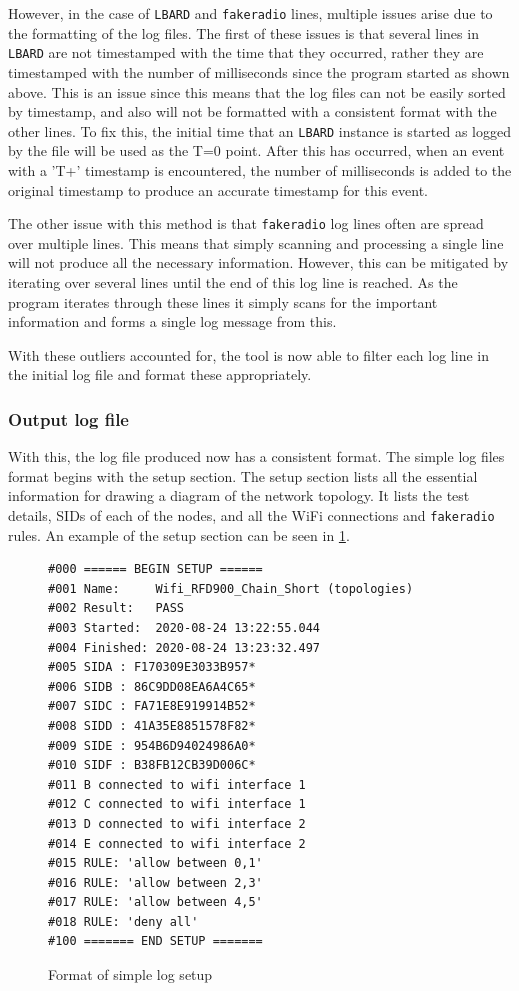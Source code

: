 However, in the case of \texttt{LBARD} and \texttt{fakeradio} lines, multiple issues arise due to the formatting of the log files.
The first of these issues is that several lines in \texttt{LBARD} are not timestamped with the time that they occurred, rather they are timestamped with the number of milliseconds since the program started as shown above.
This is an issue since this means that the log files can not be easily sorted by timestamp, and also will not be formatted with a consistent format with the other lines.
To fix this, the initial time that an \texttt{LBARD} instance is started as logged by the file will be used as the T=0 point.
After this has occurred, when an event with a 'T+' timestamp is encountered, the number of milliseconds is added to the original timestamp to produce an accurate timestamp for this event.

The other issue with this method is that \texttt{fakeradio} log lines often are spread over multiple lines.
This means that simply scanning and processing a single line will not produce all the necessary information.
However, this can be mitigated by iterating over several lines until the end of this log line is reached.
As the program iterates through these lines it simply scans for the important information and forms a single log message from this.

With these outliers accounted for, the tool is now able to filter each log line in the initial log file and format these appropriately.


\subsubsection{Output log file}
With this, the log file produced now has a consistent format.
The simple log files format begins with the setup section.
The setup section lists all the essential information for drawing a diagram of the network topology. 
It lists the test details, SIDs of each of the nodes, and all the WiFi connections and \texttt{fakeradio} rules. 
An example of the setup section can be seen in \figurename{ \ref{fig:chapter5SimpleLogSetup}}.

\begin{figure}
    \begin{centering}
\begin{lstlisting}[frame=single]
#000 ====== BEGIN SETUP ======
#001 Name:     Wifi_RFD900_Chain_Short (topologies)
#002 Result:   PASS
#003 Started:  2020-08-24 13:22:55.044
#004 Finished: 2020-08-24 13:23:32.497
#005 SIDA : F170309E3033B957*
#006 SIDB : 86C9DD08EA6A4C65*
#007 SIDC : FA71E8E919914B52*
#008 SIDD : 41A35E8851578F82*
#009 SIDE : 954B6D94024986A0*
#010 SIDF : B38FB12CB39D006C*
#011 B connected to wifi interface 1
#012 C connected to wifi interface 1
#013 D connected to wifi interface 2
#014 E connected to wifi interface 2
#015 RULE: 'allow between 0,1'
#016 RULE: 'allow between 2,3'
#017 RULE: 'allow between 4,5'
#018 RULE: 'deny all'
#100 ======= END SETUP =======    
\end{lstlisting}
    \caption{Format of simple log setup}
    \label{fig:chapter5SimpleLogSetup}
    \end{centering}
\end{figure}

